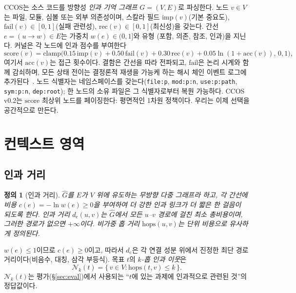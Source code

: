 \documentclass[11pt]{article}
\newtheorem{definition}{정의}
\newcommand{\dcausal}{d_{\mathrm{c}}}
\newcommand{\Nk}{\mathcal{N}_k}
\newcommand{\code}[1]{\texttt{#1}}
\begin{document}
CCOS는 소스 코드를 방향성 \emph{인과 기억 그래프} $G=(V,E)$로 파싱한다. 노드 $v\in V$는 파일, 모듈, 심볼 또는
외부 의존성이며, 스칼라 필드 $\mathrm{imp}(v)$(기본 중요도), $\mathrm{fail}(v)\in[0,1]$(실패 관련성),
$\mathrm{rec}(v)\in[0,1]$(최신성)을 갖는다. 간선 $e=(u\!\to\!w)\in E$는 가중치 $w(e)\in(0,1]$와 유형
(포함, 의존, 참조, 인과)을 지닌다. 커널은 각 노드에 인과 점수를 부여한다
\begin{equation}
\mathrm{score}(v) = \mathrm{clamp}\big(0.15\,\mathrm{imp}(v) + 0.50\,\mathrm{fail}(v)
  + 0.30\,\mathrm{rec}(v) + 0.05\ln(1{+}\mathrm{acc}(v)),\,0,1\big),
\label{eq:score}
\end{equation}
여기서 $\mathrm{acc}(v)$는 접근 횟수이다. 결함은 간선을 따라 전파되고, $\mathrm{fail}$은 논리 시계와 함께
감쇠하며, 모든 상태 전이는 결정론적 재생을 가능케 하는 해시 체인 이벤트 로그에 추가된다~\cite{haber1991timestamp}.
노드 식별자는 네임스페이스를 갖는다(\code{file:p}, \code{mod:p:n}, \code{use:p:path}, \code{sym:p:n},
\code{dep:root}); 한 노드의 소유 파일은 그 식별자로부터 복원 가능하다. CCOS v0.2는 $\mathrm{score}$ 최상위
노드를 페이징한다: 평면적인 1차원 정책이다. 우리는 이제 선택을 공간적으로 만든다.

\section{컨텍스트 영역}\label{sec:regions}

\subsection{인과 거리}

\begin{definition}[인과 거리]
$\hat G$를 $E$가 $V$ 위에 유도하는 무방향 다중 그래프라 하고, 각 간선에 비용 $c(e) = -\ln w(e) \ge 0$을
부여하여 더 강한 인과 링크가 더 짧은 한 걸음이 되도록 한다. \emph{인과 거리} $\dcausal(u,v)$는 $\hat G$에서
모든 $u$--$v$ 경로에 걸친 최소 총비용이며, 그러한 경로가 없으면 $+\infty$이다. 비가중 홉 거리
$\mathrm{hops}(u,v)$는 단위 비용으로 유사하게 정의된다.
\end{definition}

$w(e)\le 1$이므로 $c(e)\ge 0$이고, 따라서 $\dcausal$은 각 연결 성분 위에서 진정한 최단 경로 거리이다(비음수,
대칭, 삼각 부등식). 목표 $t$의 \emph{$k$-홉 인과 이웃}은
\begin{equation}
\Nk(t) = \{\, v \in V : \mathrm{hops}(t,v) \le k \,\}.
\end{equation}
$\Nk(t)$는 평가(\S\ref{sec:eval})에서 사용되는 ``$t$에 있는 과제에 인과적으로 관련된 것''의 정답값이다.
\end{document}
